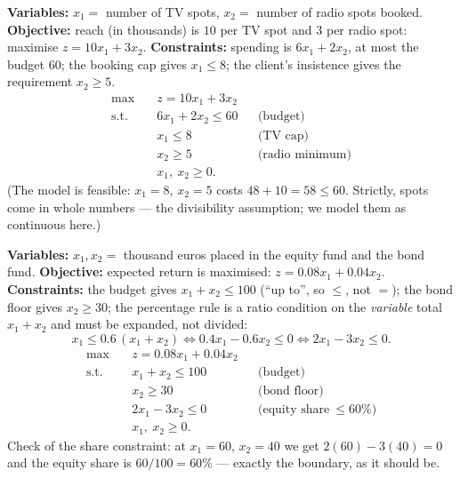 \begin{solutions}
  \item \textbf{Variables:} $x_1=$ number of TV spots, $x_2=$ number of
        radio spots booked.
        \textbf{Objective:} reach (in thousands) is $10$ per TV spot and
        $3$ per radio spot: maximise $z=10x_1+3x_2$.
        \textbf{Constraints:} spending is $6x_1+2x_2$, at most the budget
        $60$; the booking cap gives $x_1\le 8$; the client's insistence
        gives the requirement $x_2\ge 5$.
        \[
          \begin{aligned}
            \max\quad & z=10x_1+3x_2\\
            \text{s.t.}\quad & 6x_1+2x_2\le 60 &&\text{(budget)}\\
            & x_1\le 8 &&\text{(TV cap)}\\
            & x_2\ge 5 &&\text{(radio minimum)}\\
            & x_1,\ x_2\ge 0 .
          \end{aligned}
        \]
        (The model is feasible: $x_1=8$, $x_2=5$ costs $48+10=58\le 60$.
        Strictly, spots come in whole numbers — the divisibility
        assumption; we model them as continuous here.)

  \item \textbf{Variables:} $x_1,x_2=$ thousand euros placed in the
        equity fund and the bond fund.
        \textbf{Objective:} expected return is maximised:
        $z=0.08x_1+0.04x_2$.
        \textbf{Constraints:} the budget gives $x_1+x_2\le 100$ (``up
        to'', so $\le$, not $=$); the bond floor gives $x_2\ge 30$; the
        percentage rule is a ratio condition on the \emph{variable} total
        $x_1+x_2$ and must be expanded, not divided:
        \[
          x_1\le 0.6\,(x_1+x_2)
          \iff 0.4x_1-0.6x_2\le 0
          \iff 2x_1-3x_2\le 0 .
        \]
        \[
          \begin{aligned}
            \max\quad & z=0.08x_1+0.04x_2\\
            \text{s.t.}\quad & x_1+x_2\le 100 &&\text{(budget)}\\
            & x_2\ge 30 &&\text{(bond floor)}\\
            & 2x_1-3x_2\le 0 &&\text{(equity share}\ \le 60\%)\\
            & x_1,\ x_2\ge 0 .
          \end{aligned}
        \]
        Check of the share constraint: at $x_1=60$, $x_2=40$ we get
        $2(60)-3(40)=0$ and the equity share is $60/100=60\%$ — exactly
        the boundary, as it should be.


\end{solutions}
